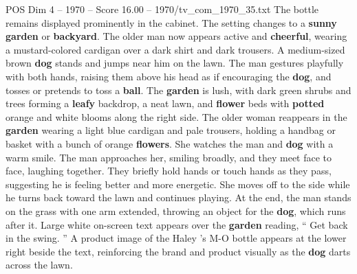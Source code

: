 \begin{textsample}{POS Dim 4 – 1970 – Score 16.00 – 1970/tv\_com\_1970\_35.txt}
The bottle remains displayed prominently in the cabinet.
The setting changes to a \textbf{sunny} \textbf{garden} or \textbf{backyard}.
The older man now appears active and \textbf{cheerful}, wearing a mustard-colored cardigan over a dark shirt and dark trousers.
A medium-sized brown \textbf{dog} stands and jumps near him on the lawn.
The man gestures playfully with both hands, raising them above his head as if encouraging the \textbf{dog}, and tosses or pretends to toss a \textbf{ball}.
The \textbf{garden} is lush, with dark green shrubs and trees forming a \textbf{leafy} backdrop, a neat lawn, and \textbf{flower} beds with \textbf{potted} orange and white blooms along the right side.
The older woman reappears in the \textbf{garden} wearing a light blue cardigan and pale trousers, holding a handbag or basket with a bunch of orange \textbf{flowers}.
She watches the man and \textbf{dog} with a warm smile.
The man approaches her, smiling broadly, and they meet face to face, laughing together.
They briefly hold hands or touch hands as they pass, suggesting he is feeling better and more energetic.
She moves off to the side while he turns back toward the lawn and continues playing.
At the end, the man stands on the grass with one arm extended, throwing an object for the \textbf{dog}, which runs after it.
Large white on-screen text appears over the \textbf{garden} reading, “ Get back in the swing. ” A product image of the Haley ’s M-O bottle appears at the lower right beside the text, reinforcing the brand and product visually as the \textbf{dog} darts across the lawn.

\end{textsample}
